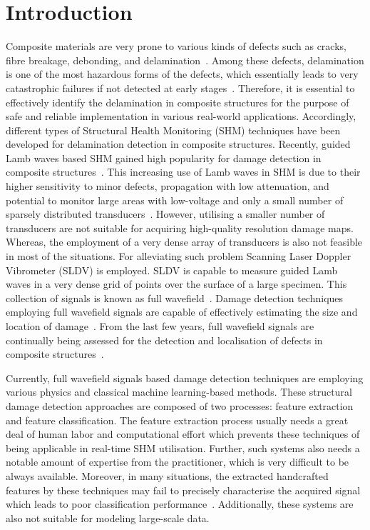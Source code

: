 \section{Introduction}
Composite materials are very prone to various kinds of defects such as cracks, fibre breakage, debonding, and delamination~\cite{ip2004delamination, smith2009composite}. Among these defects, delamination is one of the most hazardous forms of the defects, which essentially leads to very catastrophic failures if not detected at early stages~\cite{valdes1999delamination}. Therefore, it is essential to effectively identify the delamination in composite structures for the purpose of safe and reliable implementation in various real-world applications. Accordingly, different types of Structural Health Monitoring (SHM) techniques have been developed for delamination detection in composite structures. Recently, guided Lamb waves based SHM gained high popularity for damage detection in composite structures~\cite{mitra2016guided}. This increasing use of Lamb waves in SHM is due to their higher sensitivity to minor defects, propagation with low attenuation, and potential to monitor large areas with low-voltage and only a small number of sparsely distributed transducers~\cite{alleyne1992interaction, giurgiutiu2003lamb, ihn2008pitch, mitra2016guided}. However, utilising a smaller number of transducers are not suitable for acquiring high-quality resolution damage maps. Whereas, the employment of a very dense array of transducers is also not feasible in most of the situations. For alleviating such problem Scanning Laser Doppler Vibrometer (SLDV) is employed. SLDV is capable to measure guided Lamb waves in a very dense grid of points over the surface of a large specimen. This collection of signals is known as full wavefield~\cite{radzienski2019damage}. Damage detection techniques employing full wavefield signals are capable of effectively estimating the size and location of damage~\cite{girolamo2018impact, kudela2018impact}. From the last few years, full wavefield signals are continually being assessed for the detection and localisation of defects in composite structures~\cite{sohn2011delamination, sohn2011automated, rogge2013characterization, kudela2018impact, radzienski2019damage}.

Currently, full wavefield signals based damage detection techniques are employing various physics and classical machine learning-based methods. These structural damage detection approaches are composed of two processes: feature extraction and feature classification. The feature extraction process usually needs a great deal of human labor and computational effort which prevents these techniques of being applicable in real-time SHM utilisation. Further, such systems also needs a notable amount of expertise from the practitioner, which is very difficult to be always available. Moreover, in many situations, the extracted handcrafted features by these techniques may fail to precisely characterise the acquired signal which leads to poor classification performance~\cite{zhao2019deep, yuan2020machine}. Additionally, these systems are also not suitable for modeling large-scale data.

